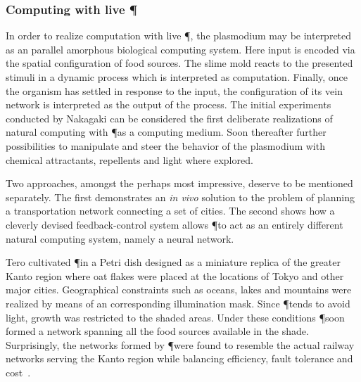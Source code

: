 			\FloatBarrier

		\subsubsection{Computing with live \P}

			In order to realize computation with live \P, the plasmodium may be interpreted as an parallel amorphous biological computing system. Here input is encoded via the spatial configuration of food sources. The slime mold reacts to the presented stimuli in a dynamic process which is interpreted as computation. Finally, once the organism has settled in response to the input, the configuration of its vein network is interpreted as the output of the process. The initial experiments conducted by Nakagaki \etal can be considered the first deliberate realizations of natural computing with \P as a computing medium. Soon thereafter further possibilities to manipulate and steer the behavior of the plasmodium with chemical attractants, repellents and light where explored.  

			Two approaches, amongst the perhaps most impressive, deserve to be mentioned separately. The first demonstrates an \textit{in vivo} solution to the problem of planning a transportation network connecting a set of cities. The second shows how a cleverly devised feedback-control system allows \P to act as an entirely different natural computing system, namely a neural network.

			Tero \etal cultivated \P in a Petri dish designed as a miniature replica of the greater Kanto region where oat flakes were placed at the locations of Tokyo and other major cities. Geographical constraints such as oceans, lakes and mountains were realized by means of an corresponding illumination mask. Since \P tends to avoid light, growth was restricted to the shaded areas. Under these conditions \P soon formed a network spanning all the food sources available in the shade. Surprisingly, the networks formed by \P were found to resemble the actual railway networks serving the Kanto region while balancing efficiency, fault tolerance and cost~\cite{Tero439}. 

